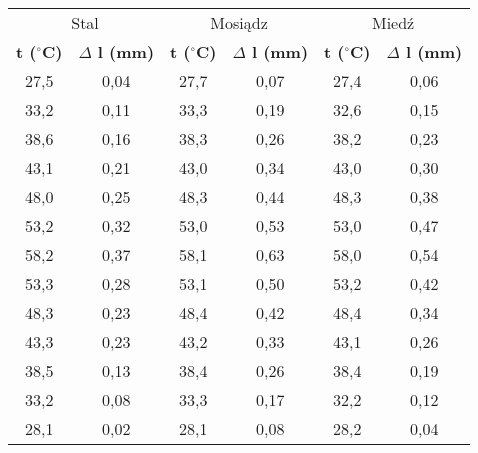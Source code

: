 \documentclass[10pt,a4paper]{article}
\begin{document}
\begin{center}
\begin{tabular}{|c|c||c|c||c|c|}
\multicolumn{2}{c}{Stal} & \multicolumn{2}{c}{Mosiądz} & \multicolumn{2}{c}{Miedź}\\
\hhline{|=|==|==|=|}
\textbf{t ($^{\circ}$C)} & \textbf{$\Delta$ l (mm)} & \textbf{t ($^{\circ}$C)} & \textbf{$\Delta$ l (mm)} & \textbf{t ($^{\circ}$C)} & \textbf{$\Delta$ l (mm)}\\
\hline
27,5 & 0,04 & 27,7 & 0,07 & 27,4 & 0,06\\
\hline
33,2 & 0,11 & 33,3 & 0,19 & 32,6 & 0,15\\
\hline
38,6 & 0,16 & 38,3 & 0,26 & 38,2 & 0,23\\
\hline
43,1 & 0,21 & 43,0 & 0,34 & 43,0 & 0,30\\
\hline
48,0 & 0,25 & 48,3 & 0,44 & 48,3 & 0,38\\
\hline
53,2 & 0,32 & 53,0 & 0,53 & 53,0 & 0,47\\
\hline
58,2 & 0,37 & 58,1 & 0,63 & 58,0 & 0,54\\
\hline
53,3 & 0,28 & 53,1 & 0,50 & 53,2 & 0,42\\
\hline
48,3 & 0,23 & 48,4 & 0,42 & 48,4 & 0,34\\
\hline
43,3 & 0,23 & 43,2 & 0,33 & 43,1 & 0,26\\
\hline
38,5 & 0,13 & 38,4 & 0,26 & 38,4 & 0,19\\
\hline
33,2 & 0,08 & 33,3 & 0,17 & 32,2 & 0,12\\
\hline
28,1 & 0,02 & 28,1 & 0,08 & 28,2 & 0,04\\
\hline

\end{tabular}
\end{center}
\end{document}
